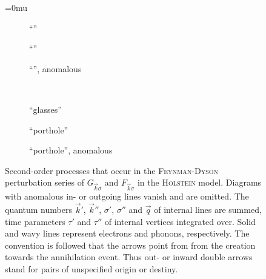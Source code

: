 \begin{figure}
    \small
    \medmuskip=0mu
    \begin{subfigure}[b]{\linewidth/3}
        \centering
        
        \caption{``''}
        \label{Hartree}
    \end{subfigure}%
    \begin{subfigure}[b]{\linewidth/3}
        \centering
        
        \caption{``''}
        \label{Fock}
    \end{subfigure}%
    \begin{subfigure}[b]{\linewidth/3}
        \centering
        
        \caption{``'', anomalous}
        \label{Fock, anomalous}
    \end{subfigure}\\[1cm]
    \begin{subfigure}[b]{\linewidth/3}
        \centering
        
        \caption{``glasses''}
        \label{glasses}
    \end{subfigure}%
    \begin{subfigure}[b]{\linewidth/3}
        \centering
        
        \caption{``porthole''}
        \label{porthole}
    \end{subfigure}%
    \begin{subfigure}[b]{\linewidth/3}
        \centering
        
        \caption{``porthole'', anomalous}
        \label{porthole, anomalous}
    \end{subfigure}
    \caption[ diagrams: 2nd-order electron-phonon interaction]
        {Second-order processes that occur in the \textsc{Feynman-Dyson}
         perturbation series of $G_{\vec k \sigma}$ and $F_{\vec k \sigma}$ in
         the \textsc{Holstein} model. Diagrams with anomalous in- or outgoing
         lines vanish and are omitted. The quantum numbers $\vec k'$, $\vec
         k''$, $\sigma'$, $\sigma''$ and $\vec q$ of internal lines are summed,
         time parameters $\tau'$ and $\tau''$ of internal vertices integrated
         over. Solid and wavy lines represent electrons and phonons,
         respectively. The convention is followed that the arrows point from
         from the creation towards the annihilation event. Thus out- or inward
         double arrows stand for  pairs of unspecified origin or
         destiny.}
    \label{Feynman diagrams}
\end{figure}

